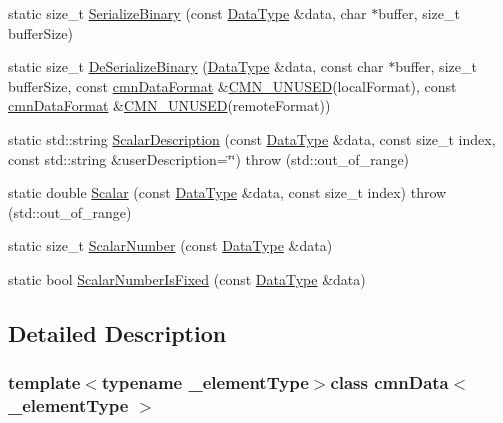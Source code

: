 \begin{DoxyCompactItemize}
\item 
static size\-\_\-t \hyperlink{classcmn_data_ac37ebe9acb11686388b664aa70612dc2}{Serialize\-Binary} (const \hyperlink{classcmn_data_a353bd6bb0af651b6301e5e2e34587da2}{Data\-Type} \&data, char $\ast$buffer, size\-\_\-t buffer\-Size)
\item 
static size\-\_\-t \hyperlink{classcmn_data_a27952f4dad3883899b9937e5da7ca646}{De\-Serialize\-Binary} (\hyperlink{classcmn_data_a353bd6bb0af651b6301e5e2e34587da2}{Data\-Type} \&data, const char $\ast$buffer, size\-\_\-t buffer\-Size, const \hyperlink{classcmn_data_format}{cmn\-Data\-Format} \&\hyperlink{cmn_portability_8h_a021894e2626935fa2305434b1e893ff6}{C\-M\-N\-\_\-\-U\-N\-U\-S\-E\-D}(local\-Format), const \hyperlink{classcmn_data_format}{cmn\-Data\-Format} \&\hyperlink{cmn_portability_8h_a021894e2626935fa2305434b1e893ff6}{C\-M\-N\-\_\-\-U\-N\-U\-S\-E\-D}(remote\-Format))
\item 
static std\-::string \hyperlink{classcmn_data_a5ab3b53a2f3dbd50aea5679b79c8c572}{Scalar\-Description} (const \hyperlink{classcmn_data_a353bd6bb0af651b6301e5e2e34587da2}{Data\-Type} \&data, const size\-\_\-t index, const std\-::string \&user\-Description=\char`\"{}\char`\"{})  throw (std\-::out\-\_\-of\-\_\-range)
\item 
static double \hyperlink{classcmn_data_a6d0e906147e388ba5f245fa8f66d209f}{Scalar} (const \hyperlink{classcmn_data_a353bd6bb0af651b6301e5e2e34587da2}{Data\-Type} \&data, const size\-\_\-t index)  throw (std\-::out\-\_\-of\-\_\-range)
\item 
static size\-\_\-t \hyperlink{classcmn_data_a30975db5a942d765a0e8ca87eb8d52ad}{Scalar\-Number} (const \hyperlink{classcmn_data_a353bd6bb0af651b6301e5e2e34587da2}{Data\-Type} \&data)
\item 
static bool \hyperlink{classcmn_data_ab09499aad5268ac49856006456513e6d}{Scalar\-Number\-Is\-Fixed} (const \hyperlink{classcmn_data_a353bd6bb0af651b6301e5e2e34587da2}{Data\-Type} \&data)
\end{DoxyCompactItemize}


\subsection{Detailed Description}
\subsubsection*{template$<$typename \-\_\-element\-Type$>$class cmn\-Data$<$ \-\_\-element\-Type $>$}

